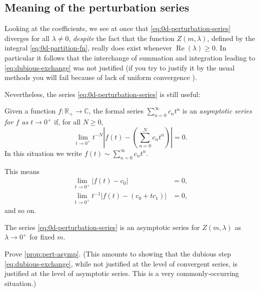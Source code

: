 \documentclass[12pt,letterpaper,reqno]{article}
\numberwithin{equation}{section}
\newcommand{\R}{\ensuremath{\mathbb R}}
\newcommand{\C}{\ensuremath{\mathbb C}}
\newcommand{\abs}[1]{\lvert#1\rvert}
\newcommand{\ti}[1]{\textit{#1}}
\DeclareMathOperator{\re}{Re}
\newcommand{\fixme}[1]{{\color{orange}{[#1]}}}
\begin{document}
\subsection{Meaning of the perturbation series}

Looking at the coefficients, we see at once that \eqref{eq:0d-perturbation-series} 
diverges for all $\lambda \neq 0$, \ti{despite} the fact that the function
$Z(m,\lambda)$, defined by the integral \eqref{eq:0d-partition-fn}, 
really does exist whenever $\re(\lambda) \ge 0$.
In particular it follows that the interchange of summation and integration leading to
\eqref{eq:dubious-exchange} was not justified (if you try to justify it by the usual methods you will fail
because of lack of uniform convergence \fixme{I think}).

Nevertheless, the series \eqref{eq:0d-perturbation-series} is still useful:
\begin{defn} 
Given a function $f: \R_+ \to \C$, 
the formal series $\sum_{n=0}^\infty c_n t^n$ is an \ti{asymptotic
series for $f$ as $t \to 0^+$} if, for all $N \ge 0$,
\begin{equation}
\label{assexpan}
 \lim_{t \to 0^+} t^{-N} \left\lvert f(t) - \left( \sum_{n=0}^N c_n t^n \right) \right\rvert = 0. 
\end{equation}
In this situation we write $f(t) \sim \sum_{n=0}^\infty c_n t^n$.
\end{defn}
This means
\begin{align}
\lim_{t \to 0^+} \abs{f(t) - c_0} &= 0, \\
\lim_{t \to 0^+} t^{-1} \abs{f(t) - (c_0 + t c_1)} &= 0,
\end{align}
and so on.
\begin{prop} \label{prop:pert-asymp} The series \eqref{eq:0d-perturbation-series}
is an asymptotic series for $Z(m,\lambda)$ as $\lambda \to 0^+$ for fixed $m$.
\end{prop}

\begin{exercise} Prove \autoref{prop:pert-asymp}. (This amounts to showing that the dubious step
\eqref{eq:dubious-exchange}, while not justified at the level of convergent series, is justified
at the level of asymptotic series. This is a very commonly-occurring situation.)
\end{exercise}
\end{document}
